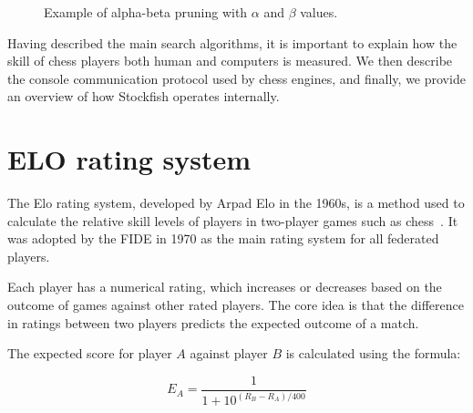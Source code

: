 \begin{figure}
    \caption{Example of alpha-beta pruning with $\alpha$ and $\beta$ values.}\label{fig:alphaBetaExample}
\end{figure}

\newpage

Having described the main search algorithms, it is important to explain how the skill of chess players both human and computers is measured. We then describe the console communication protocol used by chess engines, and finally, we provide an overview of how Stockfish operates internally.

\section{ELO rating system}

The Elo rating system, developed by Arpad Elo in the 1960s, is a method used to calculate the relative skill levels of players in two-player games such as chess~\cite{Elo}. It was adopted by the FIDE in 1970 as the main rating system for all federated players.

\vspace{1em}

Each player has a numerical rating, which increases or decreases based on the outcome of games against other rated players. The core idea is that the difference in ratings between two players predicts the expected outcome of a match.

The expected score for player \( A \) against player \( B \) is calculated using the formula:

\[
E_A = \frac{1}{1 + 10^{(R_B - R_A)/400}}
\]

